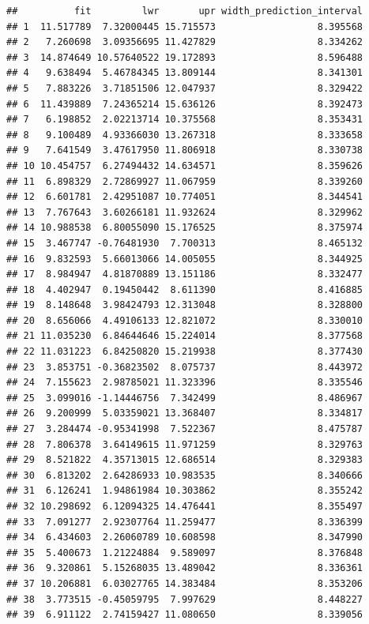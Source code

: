 \documentclass[
]{article}
\begin{document}
\begin{verbatim}
##          fit         lwr       upr width_prediction_interval
## 1  11.517789  7.32000445 15.715573                  8.395568
## 2   7.260698  3.09356695 11.427829                  8.334262
## 3  14.874649 10.57640522 19.172893                  8.596488
## 4   9.638494  5.46784345 13.809144                  8.341301
## 5   7.883226  3.71851506 12.047937                  8.329422
## 6  11.439889  7.24365214 15.636126                  8.392473
## 7   6.198852  2.02213714 10.375568                  8.353431
## 8   9.100489  4.93366030 13.267318                  8.333658
## 9   7.641549  3.47617950 11.806918                  8.330738
## 10 10.454757  6.27494432 14.634571                  8.359626
## 11  6.898329  2.72869927 11.067959                  8.339260
## 12  6.601781  2.42951087 10.774051                  8.344541
## 13  7.767643  3.60266181 11.932624                  8.329962
## 14 10.988538  6.80055090 15.176525                  8.375974
## 15  3.467747 -0.76481930  7.700313                  8.465132
## 16  9.832593  5.66013066 14.005055                  8.344925
## 17  8.984947  4.81870889 13.151186                  8.332477
## 18  4.402947  0.19450442  8.611390                  8.416885
## 19  8.148648  3.98424793 12.313048                  8.328800
## 20  8.656066  4.49106133 12.821072                  8.330010
## 21 11.035230  6.84644646 15.224014                  8.377568
## 22 11.031223  6.84250820 15.219938                  8.377430
## 23  3.853751 -0.36823502  8.075737                  8.443972
## 24  7.155623  2.98785021 11.323396                  8.335546
## 25  3.099016 -1.14446756  7.342499                  8.486967
## 26  9.200999  5.03359021 13.368407                  8.334817
## 27  3.284474 -0.95341998  7.522367                  8.475787
## 28  7.806378  3.64149615 11.971259                  8.329763
## 29  8.521822  4.35713015 12.686514                  8.329383
## 30  6.813202  2.64286933 10.983535                  8.340666
## 31  6.126241  1.94861984 10.303862                  8.355242
## 32 10.298692  6.12094325 14.476441                  8.355497
## 33  7.091277  2.92307764 11.259477                  8.336399
## 34  6.434603  2.26060789 10.608598                  8.347990
## 35  5.400673  1.21224884  9.589097                  8.376848
## 36  9.320861  5.15268035 13.489042                  8.336361
## 37 10.206881  6.03027765 14.383484                  8.353206
## 38  3.773515 -0.45059795  7.997629                  8.448227
## 39  6.911122  2.74159427 11.080650                  8.339056

\end{verbatim}
\end{document}
